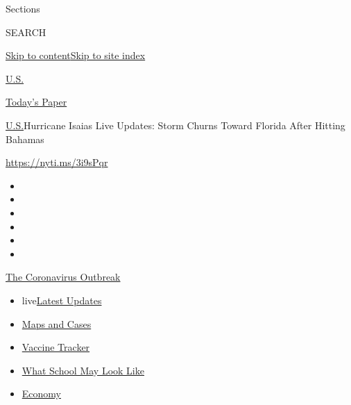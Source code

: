 Sections

SEARCH

\protect\hyperlink{site-content}{Skip to
content}\protect\hyperlink{site-index}{Skip to site index}

\href{https://www.nytimes.com/section/us}{U.S.}

\href{https://myaccount.nytimes.com/auth/login?response_type=cookie\&client_id=vi}{}

\href{https://www.nytimes.com/section/todayspaper}{Today's Paper}

\href{/section/us}{U.S.}\textbar{}Hurricane Isaias Live Updates: Storm
Churns Toward Florida After Hitting Bahamas

\url{https://nyti.ms/3i9sPqr}

\begin{itemize}
\item
\item
\item
\item
\item
\item
\end{itemize}

\href{https://www.nytimes.com/news-event/coronavirus?action=click\&pgtype=Article\&state=default\&region=TOP_BANNER\&context=storylines_menu}{The
Coronavirus Outbreak}

\begin{itemize}
\tightlist
\item
  live\href{https://www.nytimes.com/2020/08/01/world/coronavirus-covid-19.html?action=click\&pgtype=Article\&state=default\&region=TOP_BANNER\&context=storylines_menu}{Latest
  Updates}
\item
  \href{https://www.nytimes.com/interactive/2020/us/coronavirus-us-cases.html?action=click\&pgtype=Article\&state=default\&region=TOP_BANNER\&context=storylines_menu}{Maps
  and Cases}
\item
  \href{https://www.nytimes.com/interactive/2020/science/coronavirus-vaccine-tracker.html?action=click\&pgtype=Article\&state=default\&region=TOP_BANNER\&context=storylines_menu}{Vaccine
  Tracker}
\item
  \href{https://www.nytimes.com/interactive/2020/07/29/us/schools-reopening-coronavirus.html?action=click\&pgtype=Article\&state=default\&region=TOP_BANNER\&context=storylines_menu}{What
  School May Look Like}
\item
  \href{https://www.nytimes.com/live/2020/07/31/business/stock-market-today-coronavirus?action=click\&pgtype=Article\&state=default\&region=TOP_BANNER\&context=storylines_menu}{Economy}
\end{itemize}

